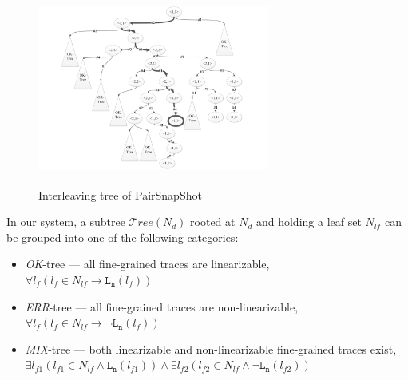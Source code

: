 \documentclass[runningheads]{llncs}
\begin{document}
\begin{figure}
\centering
\includegraphics[height = 2.5in, width = 3in]{pssinttree.pdf}
\caption{Interleaving tree of PairSnapShot}\label{fig:interleavingtreeofpairsnapshot}
\end{figure}

In our system, a subtree $\mathcal{T}ree(N_{d})$ rooted at $N_d$ and holding a leaf set $N_{lf}$ can be grouped into one of the following categories:
\begin{itemize}
  \item \textit{OK}-tree --- all fine-grained traces are linearizable,\\
  $\forall l_f \left( l_f\in N_{lf} \rightarrow \mathtt{L_n}(l_f)\right)$
  \item \textit{ERR}-tree --- all fine-grained traces are non-linearizable,\\
  $\forall l_f \left(  l_f\in N_{lf} \rightarrow \neg \mathtt{L_n}(l_f)\right)$
  \item \textit{MIX}-tree --- both linearizable and non-linearizable fine-grained traces exist,\\
  $\exists l_{f1} ( l_{f1}\in N_{lf} \wedge \mathtt{L_n}(l_{f1})) \wedge  \exists l_{f2} (l_{f2}\in N_{lf} \wedge \neg \mathtt{L_n}(l_{f2}))$

\end{itemize}
\end{document}
